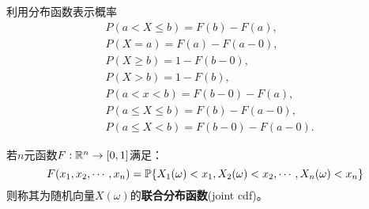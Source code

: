 
利用分布函数表示概率
\begin{align*}
     & P(a<X \le b) = F(b)-F(a),       \\
     & P(X=a) = F(a)-F(a-0),           \\
     & P(X \geq b) = 1-F(b-0),         \\
     & P(X>b) = 1-F(b),                \\
     & P(a<x<b) = F(b-0)-F(a),         \\
     & P(a \le X \le b) = F(b)-F(a-0), \\
     & P(a \le X<b) = F(b-0)-F(a-0).
\end{align*}


\begin{definition}[随机向量的分布函数]
    若$n$元函数$F : \R^n \to [0,1] $满足：
    \[ F(x_1,x_2,\cdots,x_n)=\P \{ X_1(\omega)<x_1,X_2(\omega)<x_2,\cdots,X_n(\omega)<x_n \} \]
    则称其为随机向量$X(\omega)$的\textbf{联合分布函数}(joint cdf)。
\end{definition}

